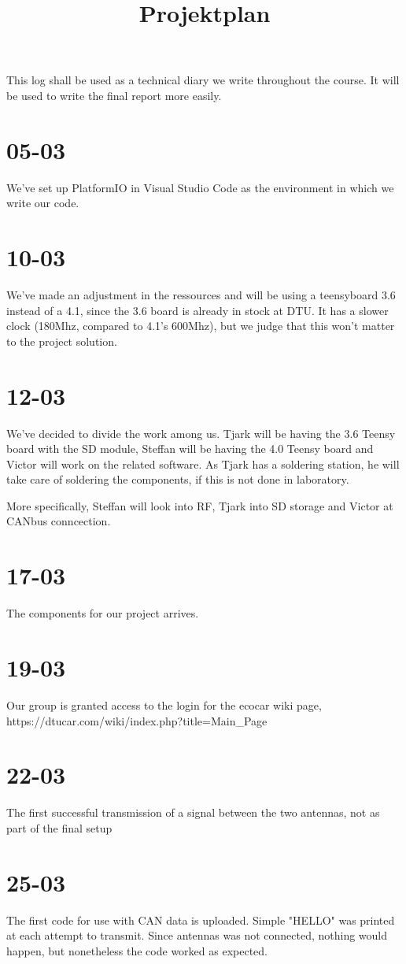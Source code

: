 \documentclass[]{article}
\title{Projektplan}
\begin{document}
This log shall be used as a technical diary we write throughout the course. It will be used to write the final report more easily.

\section{05-03}
We've set up PlatformIO in Visual Studio Code as the environment in which we write our code.

\section{10-03}
We've made an adjustment in the ressources and will be using a teensyboard 3.6 instead of a 4.1, since the 3.6 board is already in stock at DTU. It has a slower clock (180Mhz, compared to 4.1's 600Mhz), but we judge that this won't matter to the project solution.

\section{12-03}
We've decided to divide the work among us.
Tjark will be having the 3.6 Teensy board with the SD module, Steffan will be having the 4.0 Teensy board and Victor will work on the related software.
As Tjark has a soldering station, he will take care of soldering the components, if this is not done in laboratory.

More specifically, Steffan will look into RF, Tjark into SD storage and Victor at CANbus conncection.

\section{17-03}
The components for our project arrives.

\section{19-03}
Our group is granted access to the login for the ecocar wiki page, https://dtucar.com/wiki/index.php?title=Main_Page

\section{22-03}
The first successful transmission of a signal between the two antennas, not as part of the final setup

\section{25-03}
The first code for use with CAN data is uploaded. Simple "HELLO" was printed at each attempt to transmit. Since antennas was not connected, nothing would happen, but nonetheless the code worked as expected.
\end{document}
